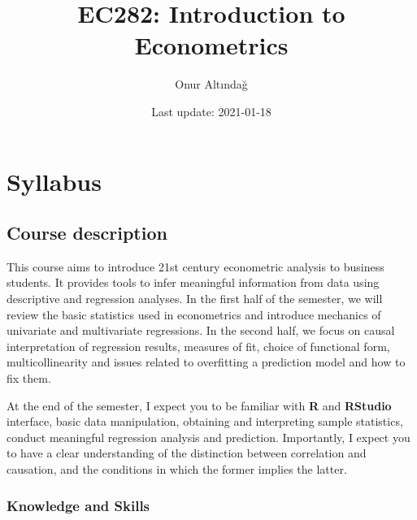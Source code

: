 \documentclass[
]{book}
\title{EC282: Introduction to Econometrics}
\author{Onur Altındağ}
\date{Last update: 2021-01-18}
\begin{document}
\maketitle

{
\setcounter{tocdepth}{1}
\tableofcontents
}
\hypertarget{syllabus}{%
\chapter*{Syllabus}\label{syllabus}}

\hypertarget{course-desctiption}{%
\section*{Course description}\label{course-desctiption}}

This course aims to introduce 21st century econometric analysis to business students. It provides tools to infer meaningful information from data using descriptive and regression analyses. In the first half of the semester, we will review the basic statistics used in econometrics and introduce mechanics of univariate and multivariate regressions. In the second half, we focus on causal interpretation of regression results, measures of fit, choice of functional form, multicollinearity and issues related to overfitting a prediction model and how to fix them.

At the end of the semester, I expect you to be familiar with \textbf{R} and \textbf{RStudio} interface, basic data manipulation, obtaining and interpreting sample statistics, conduct meaningful regression analysis and prediction. Importantly, I expect you to have a clear understanding of the distinction between correlation and causation, and the conditions in which the former implies the latter.

\hypertarget{knowledge}{%
\subsection*{Knowledge and Skills}\label{knowledge}}
\end{document}
